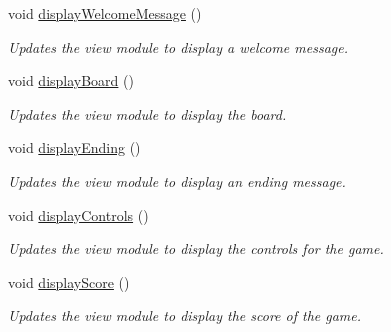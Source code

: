 \begin{DoxyCompactItemize}
\mbox{\label{classsrc_1_1GameController_afefda9765209aacb5de8d74ede712a06}} 
void \hyperlink{classsrc_1_1GameController_afefda9765209aacb5de8d74ede712a06}{display\+Welcome\+Message} ()
\begin{DoxyCompactList}\small\item\em Updates the view module to display a welcome message. \end{DoxyCompactList}\item 
\mbox{\label{classsrc_1_1GameController_a09741c684c6fed9e4f637d84aa5c8f8f}} 
void \hyperlink{classsrc_1_1GameController_a09741c684c6fed9e4f637d84aa5c8f8f}{display\+Board} ()
\begin{DoxyCompactList}\small\item\em Updates the view module to display the board. \end{DoxyCompactList}\item 
\mbox{\label{classsrc_1_1GameController_a7c4b05a481b3f507bf6a2f111f86efbb}} 
void \hyperlink{classsrc_1_1GameController_a7c4b05a481b3f507bf6a2f111f86efbb}{display\+Ending} ()
\begin{DoxyCompactList}\small\item\em Updates the view module to display an ending message. \end{DoxyCompactList}\item 
\mbox{\label{classsrc_1_1GameController_a1aaa31ecf9d88fc44c007142efbdc97f}} 
void \hyperlink{classsrc_1_1GameController_a1aaa31ecf9d88fc44c007142efbdc97f}{display\+Controls} ()
\begin{DoxyCompactList}\small\item\em Updates the view module to display the controls for the game. \end{DoxyCompactList}\item 
\mbox{\label{classsrc_1_1GameController_a3f8eb397e71c984947d52bb738eb763f}} 
void \hyperlink{classsrc_1_1GameController_a3f8eb397e71c984947d52bb738eb763f}{display\+Score} ()
\begin{DoxyCompactList}\small\item\em Updates the view module to display the score of the game. \end{DoxyCompactList}\item 

\end{DoxyCompactItemize}
